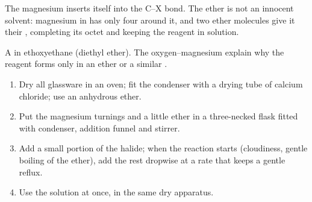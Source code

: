 The magnesium inserts itself into the C--X bond. The ether is not an
innocent solvent: magnesium in  has only four 
around it, and two ether molecules give it their , completing
its octet and keeping the reagent in solution.

\begin{omfigure}

{\small A  in ethoxyethane (diethyl ether). The
oxygen--magnesium  explain why the reagent forms only in an
ether or a similar .}
\end{omfigure}

\begin{method}\label{met:b1:organomagnesium:prepare}
\begin{enumerate}
  \item Dry all glassware in an oven; fit the condenser with a drying
        tube of calcium chloride; use an anhydrous ether.
  \item Put the magnesium turnings and a little ether in a three-necked
        flask fitted with condenser, addition funnel and stirrer.
  \item Add a small portion of the halide; when the reaction starts
        (cloudiness, gentle boiling of the ether), add the rest dropwise
        at a rate that keeps a gentle reflux.
  \item Use the solution at once, in the same dry apparatus.
\end{enumerate}
\end{method}

